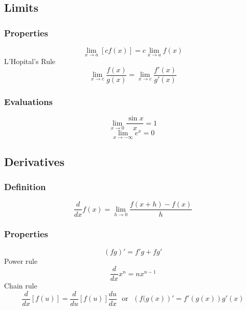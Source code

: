 \documentclass{article}
\begin{document}
	\subsection{Limits}
		\subsubsection{Properties}
			\begin{equation}
				\mathop {\lim }\limits_{x \to a} \left[ cf(x) \right] = c\mathop{\lim }\limits_{x \to a} f(x)
			\end{equation}
			L'Hopital's Rule
			\begin{equation}
				\mathop {\lim }\limits_{x \to c} \frac{{f\left( x \right)}}{{g\left( x \right)}} = \mathop {\lim }\limits_{x \to c} \frac{{f'\left( x \right)}}{{g'\left( x \right)}}
			\end{equation}
		\subsubsection{Evaluations}
			\begin{equation}
				\mathop {\lim }\limits_{x \to 0} \frac{{\sin x}}{x} = 1
			\end{equation}
			\begin{equation}
				\mathop {\lim }\limits_{x \to - \infty } e^x = 0
			\end{equation}
	\subsection{Derivatives}
		\subsubsection{Definition}
			\begin{equation}
				\frac{d}{{dx}}f\left( x \right) = \mathop {\lim }\limits_{h \to 0} \frac{{f\left( {x + h } \right) - f\left( x \right)}}{h }
			\end{equation}
		\subsubsection{Properties}
			\begin{equation}
				\left(fg\right)'=f'g+fg'
			\end{equation}
			Power rule
			\begin{equation}
				\frac{d}{dx}x^n = nx^{n-1}
			\end{equation}
			Chain rule
			\begin{equation}
				\frac{d}{{dx}}\left[ {f\left( u \right)} \right] = \frac{d}{{du}}\left[ {f\left( u \right)} \right]\frac{{du}}{{dx}} \ \ \ \mbox{or} \ \ \ \left(f(g(x)\right)'=f'\left(g(x)\right)g'(x)
			\end{equation}
\end{document}
